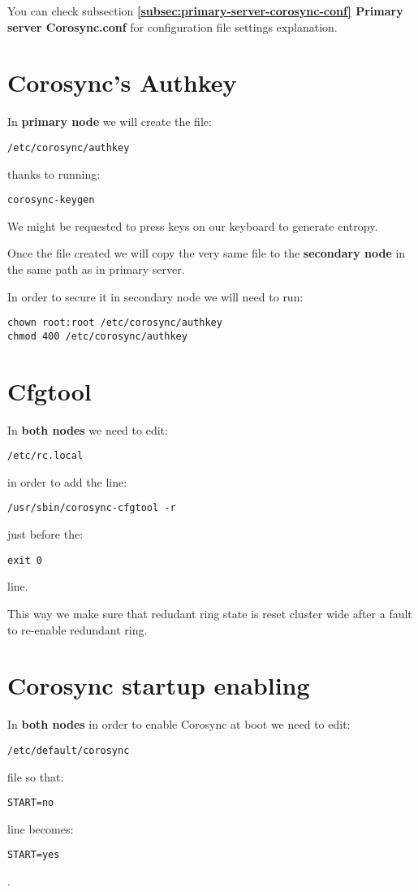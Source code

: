 You can check subsection \textbf{\ref{subsec:primary-server-corosync-conf} Primary server Corosync.conf} for configuration file settings explanation.

\section {Corosync's Authkey}
In \textbf{primary node} we will create the file:
\begin{verbatim}
/etc/corosync/authkey
\end{verbatim}
thanks to running:
\begin{verbatim}
corosync-keygen
\end{verbatim}
We might be requested to press keys on our keyboard to generate entropy.

Once the file created we will copy the very same file to the \textbf{secondary node} in the same path as in primary server.

In order to secure it in secondary node we will need to run:
\begin{verbatim}
chown root:root /etc/corosync/authkey
chmod 400 /etc/corosync/authkey
\end{verbatim}

\section {Cfgtool}

In \textbf{both nodes} we need to edit:
\begin{verbatim}
/etc/rc.local
\end{verbatim}
in order to add the line:
\begin{verbatim}
/usr/sbin/corosync-cfgtool -r
\end{verbatim}
just before the:
\begin{verbatim}
exit 0
\end{verbatim}
line.

This way we make sure that redudant ring state is reset cluster wide after a fault to re-enable redundant ring.

\section {Corosync startup enabling}
In \textbf{both nodes} in order to enable Corosync at boot we need to edit:
\begin{verbatim}
/etc/default/corosync
\end{verbatim}
file so that:
\begin{verbatim}
START=no
\end{verbatim}
line becomes:
\begin{verbatim}
START=yes
\end{verbatim}
.

